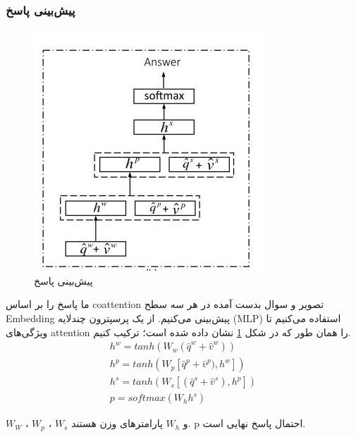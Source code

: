 {{		\subsubsection{پیش‌بینی پاسخ}
		{
			\begin{figure}
				\centering
				\includegraphics[scale=0.6]{images/answer.JPG}
				\caption{پیش‌بینی پاسخ}
				\label{fig:6}
			\end{figure}
		
			ما پاسخ را بر اساس coattention تصویر و سوال بدست آمده در هر سه سطح Embedding پیش‌بینی می‌کنیم. از یک پرسپترون چندلایه (MLP) استفاده می‌کنیم تا ویژگی‌های attention را همان طور که در شکل 
		\ref{fig:6}	
			نشان داده شده است؛ ترکیب کنیم.
			\begin{equation}
			\begin{aligned}
			h^w = tanh(W_w(\hat{q}^w + \hat{v}^w))\ \ \ \  \\
			h^p = tanh(W_p[\hat{q}^p + \hat{v}^p), h^w]) \\
			h^s = tanh(W_s[(\hat{q}^s + \hat{v}^s), h^p]) \\
			p = softmax(W_hh^s)  \ \ \ \ \ \ \ \ \ \ \ \ \ 
			\end{aligned}
			\end{equation}
		
			 $W_W$
			 ، 
			 $W_p$
			 ،
			 $W_s$
			  و
			 $W_h$
			  	پارامترهای وزن هستند. p احتمال پاسخ نهایی است.
		}
	}

}

